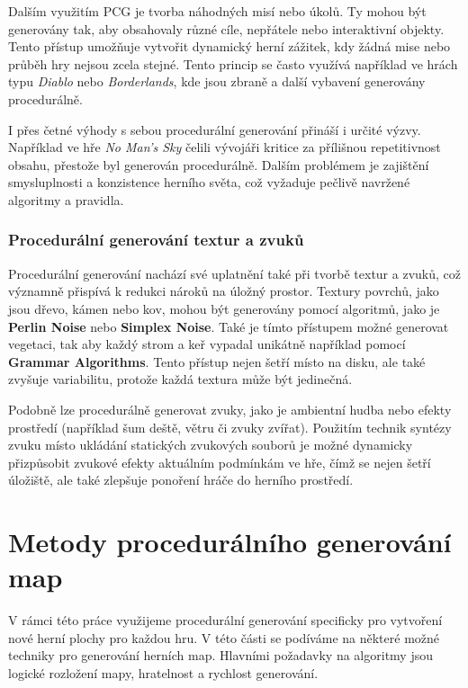 Dalším využitím PCG je tvorba náhodných misí nebo úkolů. Ty mohou být generovány tak, aby obsahovaly různé cíle, nepřátele nebo interaktivní objekty. Tento přístup umožňuje vytvořit dynamický herní zážitek, kdy žádná mise nebo průběh hry nejsou zcela stejné. Tento princip se často využívá například ve hrách typu \emph{Diablo} nebo \emph{Borderlands}, kde jsou zbraně a další vybavení generovány procedurálně.

I přes četné výhody s sebou procedurální generování přináší i určité výzvy. Například ve hře \textit{No Man's Sky} čelili vývojáři kritice za přílišnou repetitivnost obsahu, přestože byl generován procedurálně. Dalším problémem je zajištění smysluplnosti a konzistence herního světa, což vyžaduje pečlivě navržené algoritmy a pravidla.

\subsubsection{Procedurální generování textur a zvuků}
Procedurální generování nachází své uplatnění také při tvorbě textur a zvuků, což významně přispívá k redukci nároků na úložný prostor. Textury povrchů, jako jsou dřevo, kámen nebo kov, mohou být generovány pomocí algoritmů, jako je \textbf{Perlin Noise} nebo \textbf{Simplex Noise}. Také je tímto přístupem možné generovat vegetaci, tak aby každý strom a keř vypadal unikátně například pomocí \textbf{Grammar Algorithms}. Tento přístup nejen šetří místo na disku, ale také zvyšuje variabilitu, protože každá textura může být jedinečná.

Podobně lze procedurálně generovat zvuky, jako je ambientní hudba nebo efekty prostředí (například šum deště, větru či zvuky zvířat). Použitím technik syntézy zvuku místo ukládání statických zvukových souborů je možné dynamicky přizpůsobit zvukové efekty aktuálním podmínkám ve hře, čímž se nejen šetří úložiště, ale také zlepšuje ponoření hráče do herního prostředí.


\section{Metody procedurálního generování map}

V rámci této práce využijeme procedurální generování specificky pro vytvoření nové herní plochy pro každou hru. V této části se podíváme na některé možné techniky pro generování herních map. Hlavními požadavky na algoritmy jsou logické rozložení mapy, hratelnost a rychlost generování.

